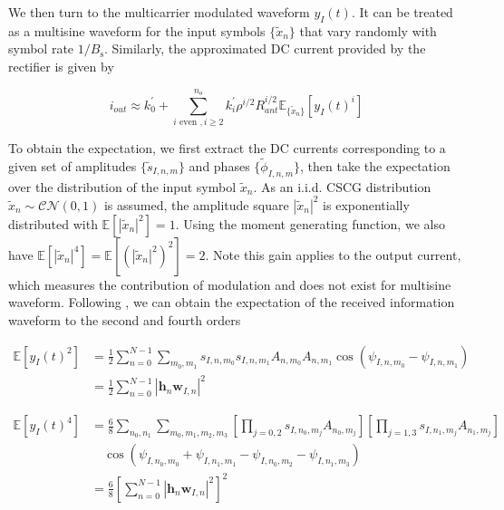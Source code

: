 We then turn to the multicarrier modulated waveform ${y_I}(t)$. It can be treated as a multisine waveform for the input symbols $\{ {{\tilde x}_n}\} $ that vary randomly with symbol rate $1/{B_{\text{s}}}$. Similarly, the approximated DC current provided by the rectifier is given by

\begin{equation}\label{eqn:current_information}
  {i_{out}} \approx k_0^\prime  + \sum\limits_{i{\text{ even }},i \geqslant 2}^{{n_o}} {k_i^\prime } {\rho ^{i/2}}R_{ant}^{i/2}{\mathbb{E}_{\{ {{\tilde x}_n}\} }}\left[ {{y_I}{{(t)}^i}} \right]
\end{equation}

To obtain the expectation, we first extract the DC currents corresponding to a given set of amplitudes $\{ {{\tilde s}_{I,n,m}}\} $ and phases $\{ {{\tilde \phi }_{I,n,m}}\} $, then take the expectation over the distribution of the input symbol ${{\tilde x}_n}$. As an i.i.d. CSCG distribution ${{\tilde x}_n}\sim\mathcal{C}\mathcal{N}(0,1)$ is assumed, the amplitude square ${\left| {{{\tilde x}_n}} \right|^2}$ is exponentially distributed with $\mathbb{E}\left[ {{{\left| {{{\tilde x}_n}} \right|}^2}} \right] = 1$. Using the moment generating function, we also have $\mathbb{E}\left[ {{{\left| {{{\tilde x}_n}} \right|}^4}} \right] = \mathbb{E}\left[ {{{\left( {{{\left| {{{\tilde x}_n}} \right|}^2}} \right)}^2}} \right] = 2$. Note this gain applies to the output current, which measures the contribution of modulation and does not exist for multisine waveform. Following \cite{Clerckx2018}, we can obtain the expectation of the received information waveform to the second and fourth orders

\begin{align}\label{eqn:information_waveform_second_order}
  \mathbb{E}\left[ {{y_I}{{(t)}^2}} \right] &= \frac{1}{2}\sum\limits_{n = 0}^{N - 1} {\sum\limits_{{m_0},{m_1}} {{s_{I,n,{m_0}}}} } {s_{I,n,{m_1}}}{A_{n,{m_0}}}{A_{n,{m_1}}}\cos \left( {{\psi _{I,n,{m_0}}} - {\psi _{I,n,{m_1}}}} \right) \\
   &= \frac{1}{2}\sum\limits_{n = 0}^{N - 1} {{{\left| {{{\mathbf{h}}_n}{{\mathbf{w}}_{I,n}}} \right|}^2}}
\end{align}

\begin{align}\label{eqn:information_waveform_fourth_order}
  \mathbb{E}\left[ {{y_I}{{(t)}^4}} \right] &= \frac{6}{8}\sum\limits_{{n_0},{n_1}} {\sum\limits_{{m_0},{m_1},{m_2},{m_3}} {\left[ {\prod\limits_{j = 0,2} {{s_{I,{n_0},{m_j}}}{A_{{n_0},{m_j}}}} } \right]\left[ {\prod\limits_{j = 1,3} {{s_{I,{n_1},{m_j}}}{A_{{n_1},{m_j}}}} } \right]} } \nonumber \\
   &\quad \cos \left( {{\psi _{I,{n_0},{m_0}}} + {\psi _{I,{n_1},{m_1}}} - {\psi _{I,{n_0},{m_2}}} - {\psi _{I,{n_1},{m_3}}}} \right) \\
   &= \frac{6}{8}{\left[ {\sum\limits_{n = 0}^{N - 1} {{{\left| {{{\mathbf{h}}_n}{{\mathbf{w}}_{I,n}}} \right|}^2}} } \right]^2}
\end{align}

